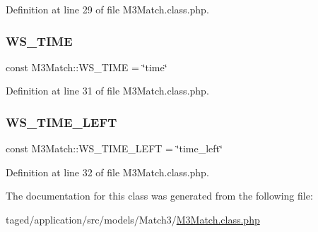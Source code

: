 Definition at line 29 of file M3\+Match.\+class.\+php.

\mbox{\label{class_m3_match_aacd1af33e91f6cb37137ccfc946020d5}} 
\subsubsection{\texorpdfstring{W\+S\+\_\+\+T\+I\+ME}{WS\_TIME}}
{\footnotesize\ttfamily const M3\+Match\+::\+W\+S\+\_\+\+T\+I\+ME = \char`\"{}time\char`\"{}}



Definition at line 31 of file M3\+Match.\+class.\+php.

\mbox{\label{class_m3_match_a27e119f20e0791cc080502f295e07e9c}} 
\subsubsection{\texorpdfstring{W\+S\+\_\+\+T\+I\+M\+E\+\_\+\+L\+E\+FT}{WS\_TIME\_LEFT}}
{\footnotesize\ttfamily const M3\+Match\+::\+W\+S\+\_\+\+T\+I\+M\+E\+\_\+\+L\+E\+FT = \char`\"{}time\+\_\+left\char`\"{}}



Definition at line 32 of file M3\+Match.\+class.\+php.



The documentation for this class was generated from the following file\+:\begin{DoxyCompactItemize}
\item 
taged/application/src/models/\+Match3/\hyperlink{_m3_match_8class_8php}{M3\+Match.\+class.\+php}\end{DoxyCompactItemize}

